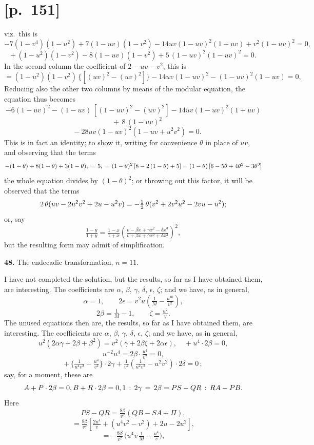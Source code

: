 \documentclass[11pt]{article}
\begin{document}
\section*{[p.~151]}
viz.\ this is
\[
-7(1-v^4)(1-u^2)+7(1-uv)(1-v^2)-14uv(1-uv)^2(1+uv)+v^2(1-uv)^2=0,
\]
\[
+\,(1-u^2)(1-v^2)-8(1-uv)(1-v^2)+5\,(1-uv)^2(1-uv)^2=0.
\]
In the second column the coefficient of $2-uv-v^2$, this is
\[
=(1-u^2)(1-v^2)\,\{[(uv)^2-(uv)^2]\}-14uv(1-uv)^2-(1-uv)^2(1-uv)=0,
\]
Reducing also the other two columns by means of the modular equation, the equation
thus becomes
\[
-6(1-uv)^2-(1-uv)\,[(1-uv)^2-(uv)^2]-14uv(1-uv)^2(1+uv)
\]
\[
\quad+\,8\,(1-uv)^2
\]
\[
\quad-28uv(1-uv)^2(1-uv+u^2v^2)=0.
\]
This is in fact an identity; to show it, writing for convenience $\theta$ in place of $uv$,
and observing that the terms
\[
-(1-\theta)+8(1-\theta)+3(1-\theta),\ =5,\\
=(1-\theta)^2\,[8-2\,(1-\theta)+5]\,\\
=(1-\theta)\,[6-5\theta+4\theta^2-3\theta^3]\\
\]
the whole equation divides by $(1-\theta)^2$; or throwing out this factor, it will be observed
that the terms
\[
2\,\theta(uv-2u^2v^2+2u-u^2v)\\
=-\tfrac{1}{2}\,\theta(v^2+2v^2u^2-2vu-u^2);
\]
or, say
\[
\tfrac{1-y}{1+y}=\tfrac{1-x}{1+x}\!\left(\tfrac{v-\beta x+\gamma x^2-\delta x^3}{v+\beta x+\gamma x^2+\delta x^3}\right)^{\!2}\!,
\]
but the resulting form may admit of simplification.

\medskip
\noindent\textbf{48.} The endecadic transformation, $n=11$.

I have not completed the solution, but the results, so far as I have obtained
them, are interesting. The coefficients are $\alpha$, $\beta$, $\gamma$, $\delta$, $\epsilon$, $\zeta$; and we have, as in general,
\[
\alpha=1,\qquad 2\epsilon=v^2u\!\left(\tfrac{1}{M}-\tfrac{u^{10}}{v^2}\right)\!,
\]
\[
2\beta=\tfrac{1}{M}-1,\qquad \zeta=\tfrac{u^2}{v}.
\]
The unused equations then are, the results, so far as I have obtained
them, are interesting. The coefficients are $\alpha$, $\beta$, $\gamma$, $\delta$, $\epsilon$, $\zeta$; and we have, as in general,
\[
u^2(2\alpha\gamma+2\beta+\beta^2)=v^2(\gamma+2\beta\zeta+2\alpha\epsilon),\quad +u^4\cdot 2\beta=0,
\]
\[
u^{-2}u^4=2\beta\cdot \tfrac{u^4}{v^2}=0,
\]
\[
+\,\big\{\tfrac{1}{u^4v^2}-\tfrac{u^4}{v^2}\big\}\cdot 2\gamma+\tfrac{1}{v^2}\!\left(\tfrac{1}{u^2v^2}-u^2v^2\right)\!\cdot 2\delta=0\,;
\]
say, for a moment, these are
\[
A+P\cdot 2\beta=0,\\
B+R\cdot 2\beta=0,\\
1\,:\,2\gamma\,=\,2\beta=PS-QR\,:\,RA-PB.
\]
Here
\[
PS-QR=\tfrac{8\beta}{v^2}(QB-SA+\Pi),
\]
\[
=\tfrac{8\beta}{v^2}\!\left[\tfrac{2u^4}{v}+(u^4v^2-v^2)+2u-2u^2\right]\!,
\]
\[
=-\tfrac{8\beta}{v^2}\,\Big(u^4v\,\tfrac{1}{M}-\tfrac{u^4}{v}\Big)\!,
\]
\end{document}
